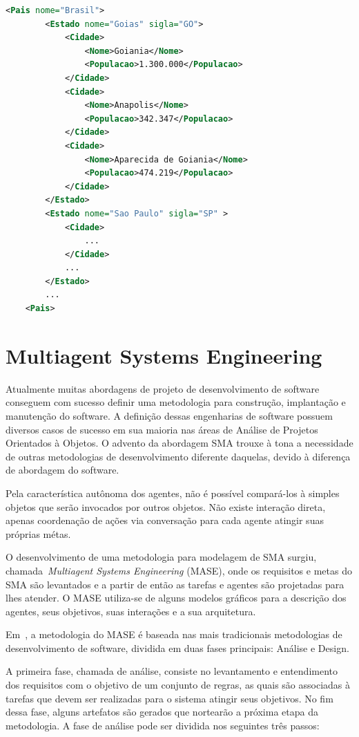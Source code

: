 \begin{lstlisting}[language=xml,label=code:exemplo-xml,caption=Exemplo de código XML representando uma ontologia simples de cidades.]
	<Pais nome="Brasil">
		<Estado nome="Goias" sigla="GO">
			<Cidade>
				<Nome>Goiania</Nome>
				<Populacao>1.300.000</Populacao>
			</Cidade>
			<Cidade>
				<Nome>Anapolis</Nome>
				<Populacao>342.347</Populacao>
			</Cidade>
			<Cidade>
				<Nome>Aparecida de Goiania</Nome>
				<Populacao>474.219</Populacao>
			</Cidade>
		</Estado>
		<Estado nome="Sao Paulo" sigla="SP" >
			<Cidade>
				...
			</Cidade>
			...
		</Estado>
		...
	<Pais>
\end{lstlisting}

\section{Multiagent Systems Engineering}\label{section:mase}

Atualmente muitas abordagens de projeto de desenvolvimento de software conseguem com sucesso definir uma metodologia para construção, implantação e manutenção do software. A definição dessas engenharias de software possuem diversos casos de sucesso em sua maioria nas áreas de Análise de Projetos Orientados à Objetos. O advento da abordagem SMA trouxe à tona a necessidade de outras metodologias de desenvolvimento diferente daquelas, devido à diferença de abordagem do software.

Pela característica autônoma dos agentes, não é possível compará-los à simples objetos que serão invocados por outros objetos. Não existe interação direta, apenas coordenação de ações via conversação para cada agente atingir suas próprias métas.

O desenvolvimento de uma metodologia para modelagem de SMA surgiu, chamada~\emph{Multiagent Systems Engineering} (MASE), onde os requisitos e metas do SMA são levantados e a partir de então as tarefas e agentes são projetadas para lhes atender. O MASE utiliza-se de alguns modelos gráficos para a descrição dos agentes, seus objetivos, suas interações e a sua arquitetura.

Em~\cite{scott01}, a metodologia do MASE é baseada nas mais tradicionais metodologias de desenvolvimento de software, dividida em duas fases principais: Análise e Design.

A primeira fase, chamada de análise, consiste no levantamento e entendimento dos requisitos com o objetivo de um conjunto de regras, as quais são associadas à tarefas que devem ser realizadas para o sistema atingir seus objetivos. No fim dessa fase, alguns artefatos são gerados que nortearão a próxima etapa da metodologia. A fase de análise pode ser dividida nos seguintes três passos:

